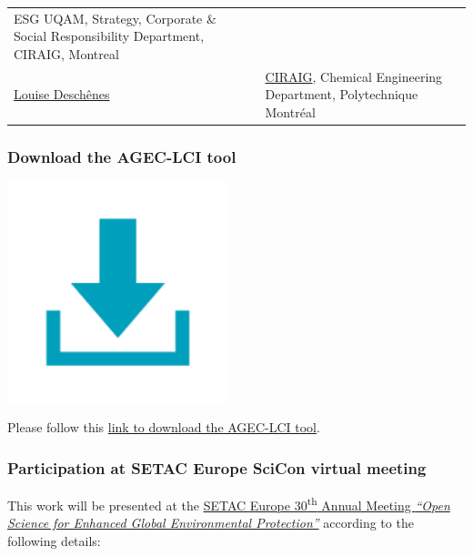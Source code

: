 \documentclass[openany]{book}
\begin{document}
\begin{longtable}[]{@{}ll@{}}
\begin{minipage}[t]{0.51\columnwidth}
ESG UQAM, Strategy, Corporate \& Social Responsibility Department, CIRAIG, Montreal\strut
\end{minipage}\tabularnewline
\begin{minipage}[t]{0.43\columnwidth}\raggedright
\href{https://www.polymtl.ca/expertises/deschenes-louise}{Louise Deschênes}\strut
\end{minipage} & \begin{minipage}[t]{0.51\columnwidth}\raggedright
\href{http://www.ciraig.org/fr/}{CIRAIG}, Chemical Engineering Department, Polytechnique Montréal\strut
\end{minipage}\tabularnewline
\bottomrule
\end{longtable}

\hypertarget{download-the-agec-lci-tool}{%
\subsubsection*{Download the AGEC-LCI tool}\label{download-the-agec-lci-tool}}

\includegraphics[width=2.53in]{Figures/download_icon}

Please follow this \href{}{link to download the AGEC-LCI tool}.

\hypertarget{participation-at-setac-europe-scicon-virtual-meeting}{%
\subsubsection*{Participation at SETAC Europe SciCon virtual meeting}\label{participation-at-setac-europe-scicon-virtual-meeting}}

This work will be presented at the \href{https://dublin.setac.org/}{SETAC Europe 30\textsuperscript{th} Annual Meeting \emph{``Open Science for Enhanced Global Environmental Protection''}} according to the following details:
\end{document}
